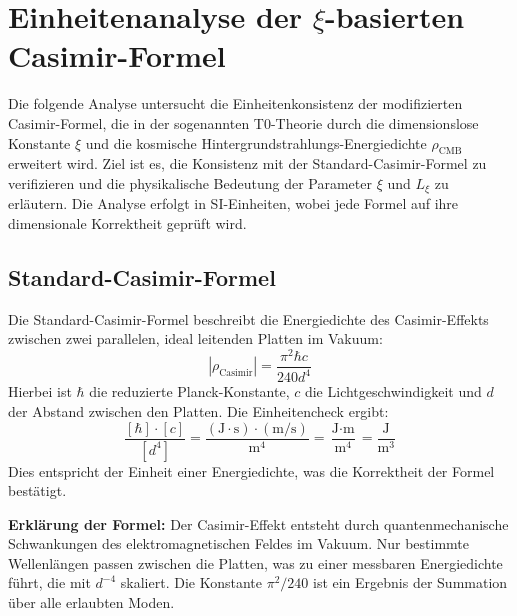 \documentclass{article}
\begin{document}
	
	\section{Einheitenanalyse der $\xi$-basierten Casimir-Formel}
	Die folgende Analyse untersucht die Einheitenkonsistenz der modifizierten Casimir-Formel, die in der sogenannten T0-Theorie durch die dimensionslose Konstante $\xi$ und die kosmische Hintergrundstrahlungs-Energiedichte $\rho_{\text{CMB}}$ erweitert wird. Ziel ist es, die Konsistenz mit der Standard-Casimir-Formel zu verifizieren und die physikalische Bedeutung der Parameter $\xi$ und $L_\xi$ zu erläutern. Die Analyse erfolgt in SI-Einheiten, wobei jede Formel auf ihre dimensionale Korrektheit geprüft wird.
	
	\subsection{Standard-Casimir-Formel}
	Die Standard-Casimir-Formel beschreibt die Energiedichte des Casimir-Effekts zwischen zwei parallelen, ideal leitenden Platten im Vakuum:
	\begin{equation}
		|\rho_{\text{Casimir}}| = \frac{\pi^2 \hbar c}{240 d^4}
	\end{equation}
	Hierbei ist $\hbar$ die reduzierte Planck-Konstante, $c$ die Lichtgeschwindigkeit und $d$ der Abstand zwischen den Platten. Die Einheitencheck ergibt:
	\begin{equation}
		\frac{[\hbar] \cdot [c]}{[d^4]} = \frac{(\text{J} \cdot \text{s}) \cdot (\text{m}/\text{s})}{\text{m}^4} = \frac{\text{J} \cdot \text{m}}{\text{m}^4} = \frac{\text{J}}{\text{m}^3}
	\end{equation}
	Dies entspricht der Einheit einer Energiedichte, was die Korrektheit der Formel bestätigt.
	
	\textbf{Erklärung der Formel:} Der Casimir-Effekt entsteht durch quantenmechanische Schwankungen des elektromagnetischen Feldes im Vakuum. Nur bestimmte Wellenlängen passen zwischen die Platten, was zu einer messbaren Energiedichte führt, die mit $d^{-4}$ skaliert. Die Konstante $\pi^2/240$ ist ein Ergebnis der Summation über alle erlaubten Moden.
	
\end{document}
